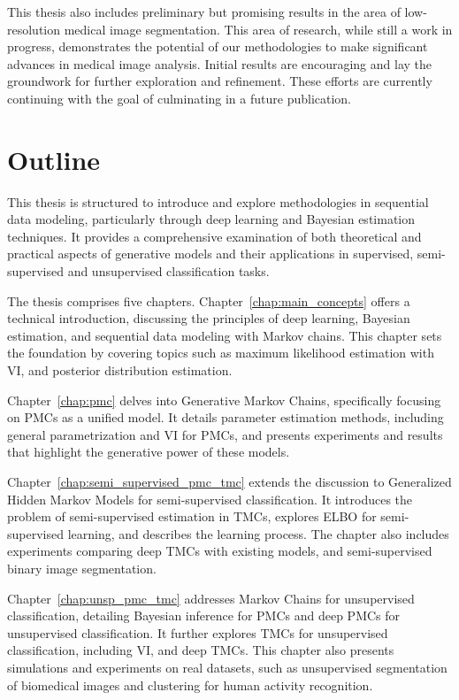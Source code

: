 This thesis also includes preliminary but promising results in the area
of low-resolution medical image segmentation. This area of research, while still
a work in progress, demonstrates the potential of our methodologies to make
significant advances in medical image analysis. Initial results are encouraging
and lay the groundwork for further exploration and refinement. 
These efforts are currently continuing with the goal of culminating 
in a future publication. 



\vspace{.30cm}
\section*{Outline}
This thesis is structured to introduce and explore  methodologies in
sequential data modeling, particularly through deep learning and Bayesian
estimation techniques. It provides a comprehensive examination of both
theoretical and practical aspects of generative models and their applications in
supervised,
semi-supervised and unsupervised classification tasks. 

The thesis comprises
five chapters. Chapter~\ref{chap:main_concepts} 
offers a technical introduction, discussing the
principles of deep learning, Bayesian estimation, and sequential data modeling
with Markov chains. This chapter sets the foundation by covering topics such as
maximum likelihood estimation with VI, and posterior distribution estimation.

Chapter~\ref{chap:pmc} 
delves into Generative Markov
Chains, specifically focusing on PMCs as a unified
model. It details parameter estimation methods, including general
parametrization and VI for PMCs, and presents experiments and
results that highlight the generative power of these models. 

Chapter~\ref{chap:semi_supervised_pmc_tmc}
extends the discussion to Generalized Hidden Markov Models for semi-supervised
classification. It introduces the problem of semi-supervised estimation in TMCs,
explores ELBO for semi-supervised learning, and describes the learning process. 
The chapter also includes experiments comparing deep TMCs
with existing models, and semi-supervised binary image
segmentation. 

Chapter~\ref{chap:unsp_pmc_tmc} 
addresses Markov Chains for unsupervised classification,
detailing Bayesian inference for PMCs and deep PMCs for unsupervised
classification. It further explores TMCs for unsupervised classification,
including VI, and deep TMCs. This
chapter also presents simulations and experiments on real datasets, such as
unsupervised segmentation of biomedical images and clustering for human activity
recognition. 

